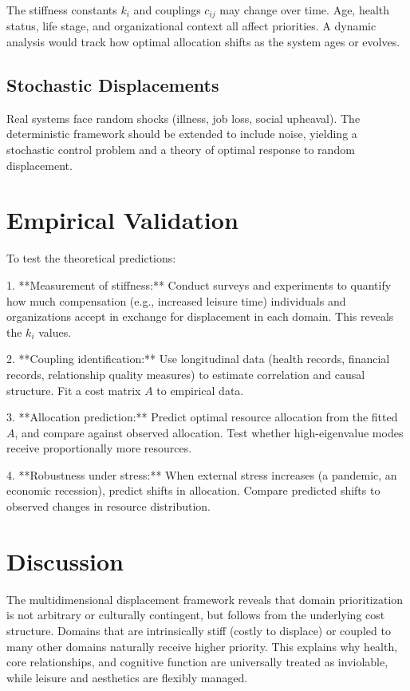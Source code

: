 \documentclass[12pt]{article}
\begin{document}
The stiffness constants $k_i$ and couplings $c_{ij}$ may change over time. Age, health status, life stage, and organizational context all affect priorities. A dynamic analysis would track how optimal allocation shifts as the system ages or evolves.

\subsection{Stochastic Displacements}

Real systems face random shocks (illness, job loss, social upheaval). The deterministic framework should be extended to include noise, yielding a stochastic control problem and a theory of optimal response to random displacement.

\section{Empirical Validation}

To test the theoretical predictions:

1. **Measurement of stiffness:** Conduct surveys and experiments to quantify how much compensation (e.g., increased leisure time) individuals and organizations accept in exchange for displacement in each domain. This reveals the $k_i$ values.

2. **Coupling identification:** Use longitudinal data (health records, financial records, relationship quality measures) to estimate correlation and causal structure. Fit a cost matrix $A$ to empirical data.

3. **Allocation prediction:** Predict optimal resource allocation from the fitted $A$, and compare against observed allocation. Test whether high-eigenvalue modes receive proportionally more resources.

4. **Robustness under stress:** When external stress increases (a pandemic, an economic recession), predict shifts in allocation. Compare predicted shifts to observed changes in resource distribution.

\section{Discussion}

The multidimensional displacement framework reveals that domain prioritization is not arbitrary or culturally contingent, but follows from the underlying cost structure. Domains that are intrinsically stiff (costly to displace) or coupled to many other domains naturally receive higher priority. This explains why health, core relationships, and cognitive function are universally treated as inviolable, while leisure and aesthetics are flexibly managed.
\end{document}
